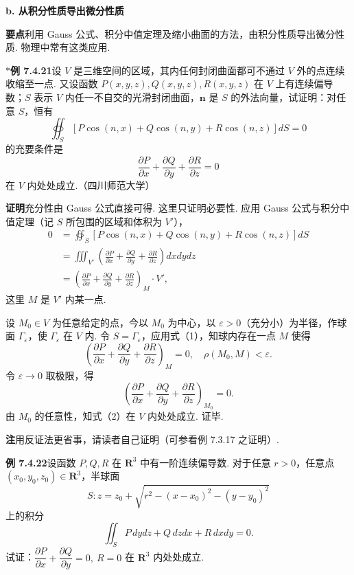 \documentclass[UTF8,12pt,a4paper,fontset=fandol]{ctexart}
\begin{document}
\noindent\textbf{b. 从积分性质导出微分性质}

\noindent\textbf{要点}\quad 利用 Gauss 公式、积分中值定理及缩小曲面的方法，由积分性质导出微分性质. 物理中常有这类应用.

\noindent\textbf{$*$例 7.4.21}\quad 设 $V$ 是三维空间的区域，其内任何封闭曲面都可不通过 $V$ 外的点连续收缩至一点. 又设函数 $P(x,y,z),Q(x,y,z),R(x,y,z)$ 在 $V$ 上有连续偏导数；$S$ 表示 $V$ 内任一不自交的光滑封闭曲面，$\mathbf n$ 是 $S$ 的外法向量，试证明：对任意 $S$，恒有
\[
\oiint_S[P\cos(n,x)+Q\cos(n,y)+R\cos(n,z)]dS=0
\]
的充要条件是
\[
\frac{\partial P}{\partial x}+\frac{\partial Q}{\partial y}+\frac{\partial R}{\partial z}=0
\]
在 $V$ 内处处成立.（四川师范大学）

\noindent\textbf{证明}\quad 充分性由 Gauss 公式直接可得. 这里只证明必要性. 应用 Gauss 公式与积分中值定理（记 $S$ 所包围的区域和体积为 $V'$），
\begin{equation}
\begin{aligned}
0&=\oiint_S[P\cos(n,x)+Q\cos(n,y)+R\cos(n,z)]dS\\
&=\iiint_{V'}\left(\frac{\partial P}{\partial x}+\frac{\partial Q}{\partial y}+\frac{\partial R}{\partial z}\right)dxdydz\\
&=\left(\frac{\partial P}{\partial x}+\frac{\partial Q}{\partial y}+\frac{\partial R}{\partial z}\right)_M\cdot V',
\end{aligned}
\tag{1}
\end{equation}
这里 $M$ 是 $V'$ 内某一点.

设 $M_0\in V$ 为任意给定的点，今以 $M_0$ 为中心，以 $\varepsilon>0$（充分小）为半径，作球面 $\Gamma_\varepsilon$，使 $\Gamma_\varepsilon$ 在 $V$ 内. 令 $S=\Gamma_\varepsilon$，应用式（1），知球内存在一点 $M$ 使得
\[
\left(\frac{\partial P}{\partial x}+\frac{\partial Q}{\partial y}+\frac{\partial R}{\partial z}\right)_M=0,\quad \rho(M_0,M)<\varepsilon.
\]
令 $\varepsilon\to0$ 取极限，得
\begin{equation}
\left(\frac{\partial P}{\partial x}+\frac{\partial Q}{\partial y}+\frac{\partial R}{\partial z}\right)_{M_0}=0.
\tag{2}
\end{equation}
由 $M_0$ 的任意性，知式（2）在 $V$ 内处处成立. 证毕.

\noindent\textbf{注}\quad 用反证法更省事，请读者自己证明（可参看例 7.3.17 之证明）.

\noindent\textbf{例 7.4.22}\quad 设函数 $P,Q,R$ 在 $\mathbf R^3$ 中有一阶连续偏导数. 对于任意 $r>0$，任意点 $(x_0,y_0,z_0)\in\mathbf R^3$，半球面
\[
S:z=z_0+\sqrt{r^2-(x-x_0)^2-(y-y_0)^2}
\]
上的积分
\[
\iint_S P\,dydz+Q\,dzdx+R\,dxdy=0.
\]
试证：$\dfrac{\partial P}{\partial x}+\dfrac{\partial Q}{\partial y}=0,\ R=0$ 在 $\mathbf R^3$ 内处处成立.
\end{document}
